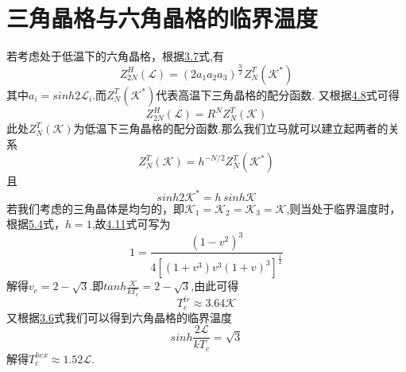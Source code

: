 \documentclass[a4paper]{book}
\begin{document}
\chapter{三角晶格与六角晶格的临界温度}
若考虑处于低温下的六角晶格，根据\hyperref[3.7]{3.7}式,有
\begin{equation}
	Z^{H}_{2N}(\mathcal{L})=(2a_1a_2a_3)^{\frac{N}{2}}Z^{T}_N(\mathcal{K}^*)
\end{equation}
其中$a_i=sinh2\mathcal{L}_i$.而$Z^{T}_N(\mathcal{K}^*)$代表高温下三角晶格的配分函数.
又根据\hyperref[4.8]{4.8}式可得
\begin{equation}
	Z_{2N}^H(\mathcal{L})=R^NZ^T_N(\mathcal{K})
\end{equation}
此处$Z^{T}_N(\mathcal{K})$为低温下三角晶格的配分函数.那么我们立马就可以建立起两者的关系
\begin{equation}
	Z^T_N(\mathcal{K})=h^{-N/2}Z^{T}_N(\mathcal{K}^*)
\end{equation}
且
\begin{equation}\label{5.4}
	sinh2\mathcal{K}^*=h\,sinh\mathcal{K}
\end{equation}
若我们考虑的三角晶体是均匀的，即$\mathcal{K}_1=\mathcal{K}_2=\mathcal{K}_3=\mathcal{K}$,则当处于临界温度时，根据\hyperref[5.4]{5.4}式，$h=1$,故\hyperref[4.11]{4.11}式可写为
\begin{equation}
		1=\frac{(1-v^2)^3}{4[(1+v^3)v^3(1+v)^3]^{\frac{1}{2}}}
\end{equation}
解得$v_c=2-\sqrt{3}$.即$tanh\frac{\mathcal{K}}{kT_c}=2-\sqrt{3}$,由此可得
\begin{equation}
	T^{tr}_c\approx3.64\mathcal{K}
\end{equation}
又根据\hyperref[3.6]{3.6}式我们可以得到六角晶格的临界温度
\begin{equation}
	sinh\frac{2\mathcal{L}}{kT_c}=\sqrt{3}
\end{equation}
解得$T^{hex}_c\approx1.52\mathcal{L}$.
\end{document}

